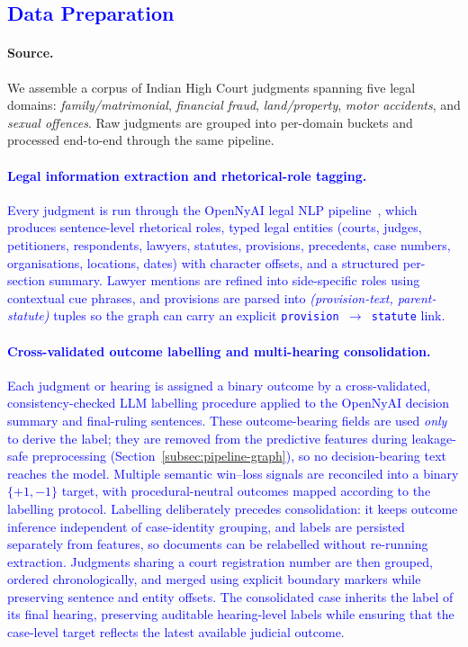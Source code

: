 \documentclass[runningheads]{llncs}
\begin{document}
\subsection{\textcolor{blue}{Data Preparation}}
\label{subsec:pipeline-data}

\paragraph{Source.}
We assemble a corpus of Indian High Court judgments spanning five legal domains: \emph{family/matrimonial}, \emph{financial fraud}, \emph{land/property}, \emph{motor accidents}, and \emph{sexual offences}. Raw judgments are grouped into per-domain buckets and processed end-to-end through the same pipeline.

\paragraph{\textcolor{blue}{Legal information extraction and rhetorical-role tagging.}} \textcolor{blue}{Every judgment is run through the OpenNyAI legal NLP pipeline~\cite{kalamkar2022opennyai}, which produces sentence-level rhetorical roles, typed legal entities (courts, judges, petitioners, respondents, lawyers, statutes, provisions, precedents, case numbers, organisations, locations, dates) with character offsets, and a structured per-section summary. Lawyer mentions are refined into side-specific roles using contextual cue phrases, and provisions are parsed into \emph{(provision-text, parent-statute)} tuples so the graph can carry an explicit \texttt{provision $\rightarrow$ statute} link.}

\paragraph{\textcolor{blue}{Cross-validated outcome labelling and multi-hearing consolidation.}} \textcolor{blue}{Each judgment or hearing is assigned a binary outcome by a cross-validated,
consistency-checked LLM labelling procedure applied to the OpenNyAI decision
summary and final-ruling sentences. These outcome-bearing fields are used
\emph{only} to derive the label; they are removed from the predictive features
during leakage-safe preprocessing (Section~\ref{subsec:pipeline-graph}), so no
decision-bearing text reaches the model. Multiple semantic win--loss signals
are reconciled into a binary $\{+1,-1\}$ target, with procedural-neutral
outcomes mapped according to the labelling protocol. Labelling deliberately
precedes consolidation: it keeps outcome inference independent of
case-identity grouping, and labels are persisted separately from features, so
documents can be relabelled without re-running extraction. Judgments sharing a
court registration number are then grouped, ordered chronologically, and
merged using explicit boundary markers while preserving sentence and entity
offsets. The consolidated case inherits the label of its final hearing,
preserving auditable hearing-level labels while ensuring that the case-level
target reflects the latest available judicial outcome.}
\end{document}
